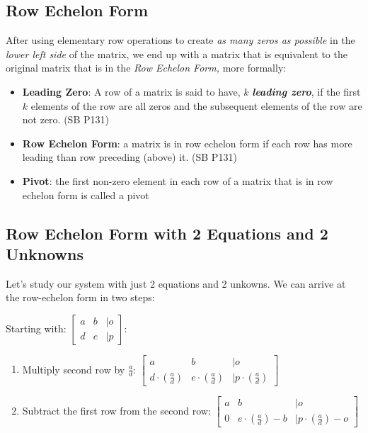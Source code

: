 \documentclass[
]{book}
\begin{document}
\hypertarget{row-echelon-form}{%
\subsection{Row Echelon Form}\label{row-echelon-form}}

After using elementary row operations to create \emph{as many zeros as
possible} in the \emph{lower left side} of the matrix, we end up with a
matrix that is equivalent to the original matrix that is in the \emph{Row
Echelon Form,} more formally:

\begin{itemize}
\item
  \textbf{Leading Zero}: A row of a matrix is said to have, \(k\) \textbf{\emph{leading
  zero}}, if the first \(k\) elements of the row are all zeros and the
  subsequent elements of the row are not zero. (SB P131)
\item
  \textbf{Row Echelon Form}: a matrix is in row echelon form if each row
  has more leading than row preceding (above) it. (SB P131)
\item
  \textbf{Pivot}: the first non-zero element in each row of a matrix that
  is in row echelon form is called a pivot
\end{itemize}

\hypertarget{row-echelon-form-with-2-equations-and-2-unknowns}{%
\subsection{Row Echelon Form with 2 Equations and 2 Unknowns}\label{row-echelon-form-with-2-equations-and-2-unknowns}}

Let's study our system with just 2 equations and 2 unkowns. We can
arrive at the row-echelon form in two steps:

Starting with: \(\left\lbrack \begin{array}{ccl} a & b & |o\\ d & e & |p \end{array}\right\rbrack\):

\begin{enumerate}
\def\labelenumi{\arabic{enumi}.}
\item
  Multiply second row by \(\frac{a}{d}\):
  \(\left\lbrack \begin{array}{ccl} a & b & |o\\ d\cdot (\frac{a}{d}) & e\cdot (\frac{a}{d}) & |p\cdot (\frac{a}{d}) \end{array}\right\rbrack\)
\item
  Subtract the first row from the second row:
  \(\left\lbrack \begin{array}{ccl} a & b & |o\\ 0 & e\cdot (\frac{a}{d})-b & |p\cdot (\frac{a}{d})-o \end{array}\right\rbrack\)
\end{enumerate}
\end{document}
